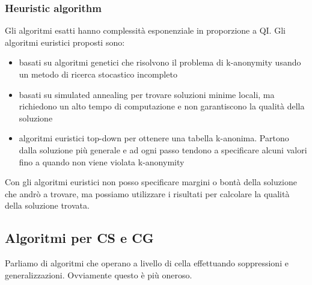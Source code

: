 \subsubsection{Heuristic algorithm}
Gli algoritmi esatti hanno complessità esponenziale in proporzione a QI. Gli algoritmi euristici proposti sono:
\begin{itemize}
    \item basati su algoritmi genetici che risolvono il problema di k-anonymity usando un metodo di ricerca stocastico incompleto
    \item basati su simulated annealing per trovare soluzioni minime locali, ma richiedono un alto tempo di computazione e non garantiscono la qualità della soluzione
    \item algoritmi euristici top-down per ottenere una tabella k-anonima. Partono dalla soluzione più generale e ad ogni passo tendono a specificare alcuni valori fino a quando non viene violata k-anonymity
\end{itemize}
Con gli algoritmi euristici non posso specificare margini o bontà della soluzione che andrò a trovare, ma possiamo utilizzare i risultati per calcolare la qualità della soluzione trovata.

\subsection{Algoritmi per CS e CG}
Parliamo di algoritmi che operano a livello di cella effettuando soppressioni e generalizzazioni. Ovviamente questo è più oneroso.
